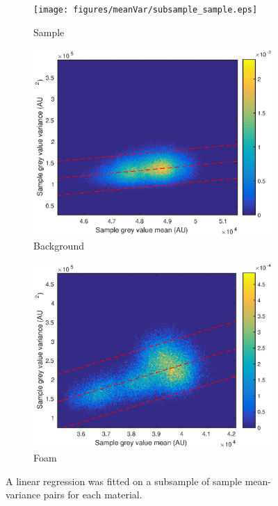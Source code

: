 \documentclass[12pt]{report}
\begin{document}
\begin{figure}
	\centering
	\begin{subfigure}{0.45\textwidth}
		\texttt{[image: figures/meanVar/subsample\_sample.eps]}
		\caption{Sample}
	\end{subfigure}
	\begin{subfigure}{0.45\textwidth}
		\includegraphics[width=\textwidth]{figures/meanVar/subsample_background.eps}
		\caption{Background}
	\end{subfigure}
	\begin{subfigure}{0.45\textwidth}
		\includegraphics[width=\textwidth]{figures/meanVar/subsample_foam.eps}
		\caption{Foam}
	\end{subfigure}
	\caption{A linear regression was fitted on a subsample of sample mean-variance pairs for each material.}
\end{figure}
\end{document}

